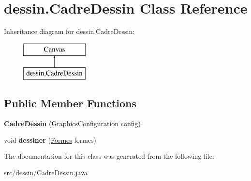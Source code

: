 \hypertarget{classdessin_1_1_cadre_dessin}{}\section{dessin.\+Cadre\+Dessin Class Reference}
\label{classdessin_1_1_cadre_dessin}
Inheritance diagram for dessin.\+Cadre\+Dessin\+:\begin{figure}[H]
\begin{center}
\leavevmode
\includegraphics[height=2.000000cm]{classdessin_1_1_cadre_dessin}
\end{center}
\end{figure}
\subsection*{Public Member Functions}
\begin{DoxyCompactItemize}
\item 
\mbox{\label{classdessin_1_1_cadre_dessin_a269383f046990a58447dba6e3e4f3d52}} 
{\bfseries Cadre\+Dessin} (Graphics\+Configuration config)
\item 
\mbox{\label{classdessin_1_1_cadre_dessin_ad6caf507960cc61be665dede16513af0}} 
void {\bfseries dessiner} (\mbox{\hyperlink{classdessin_1_1_formes}{Formes}} formes)
\end{DoxyCompactItemize}


The documentation for this class was generated from the following file\+:\begin{DoxyCompactItemize}
\item 
src/dessin/Cadre\+Dessin.\+java\end{DoxyCompactItemize}
